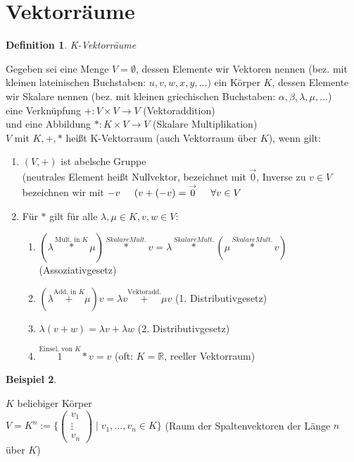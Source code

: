 \documentclass[a4paper,11pt]{article}
\newtheorem{definition}{Definition}[section]
\newtheorem{bsp}[definition]{Beispiel}
\begin{document}
\section{Vektorräume}
\begin{definition}
K-Vektorräume
\end{definition}
Gegeben sei eine Menge $V=\emptyset$, dessen Elemente wir Vektoren nennen (bez. mit kleinen lateinischen Buchstaben: $u, v, w, x, y, ...)$ ein Körper $K$, dessen Elemente wir Skalare nennen (bez. mit kleinen griechischen Buchstaben: $\alpha, \beta, \lambda, \mu, ...$) \\
eine Verknüpfung $+: V\times V\rightarrow V$ (Vektoraddition) \\
und eine Abbildung $*: K\times V\rightarrow V$ (Skalare Multiplikation) \\
$V$ mit $K,+,*$ heißt K-Vektorraum (auch Vektorraum über $K$), wenn gilt: \\
\begin{enumerate}[label=(\arabic*)]
\vspace{-5mm}
\item $(V,+)$ ist abelsche Gruppe \\
(neutrales Element heißt Nullvektor, bezeichnet mit $\overset{\rightarrow}{0}$, Inverse zu $v\in V$ bezeichnen wir mit $-v\hspace{5mm}(v+(-v)=\overset{\rightarrow}{0}\hspace{5mm}\forall v\in V$
\item Für $*$ gilt für alle $\lambda, \mu\in K, v,w\in V$:
\begin{enumerate}[label=(2.\arabic*)]
\item $(\lambda \overset{\text{Mult. in $K$}}{*} \mu)\overset{Skalare Mult.}{*}v = \lambda\overset{Skalare Mult.}{*}(\mu \overset{Skalare Mult.}{*}v)$ (Assoziativgesetz)
\item $(\lambda\overset{\text{Add. in $K$}}{+}\mu)v=\lambda v\overset{\text{Vektoradd.}}{+}\mu v$ (1. Distributivgesetz)
\item $\lambda(v+w)=\lambda v+\lambda w$ (2. Distributivgesetz)
\item $\overset{\text{Einsel. von $K$}}{1}*v=v$ (oft: $K=\mathbb{R}$, reeller Vektorraum)
\end{enumerate}
\end{enumerate}
\begin{bsp}
\end{bsp}
$K$ beliebiger Körper \\
$V=K^n:=\{\begin{pmatrix}v_1 \\ \vdots \\ v_n\end{pmatrix}\mid v_1,...,v_n\in K\}$ (Raum der Spaltenvektoren der Länge $n$ über $K$) \\
\end{document}
